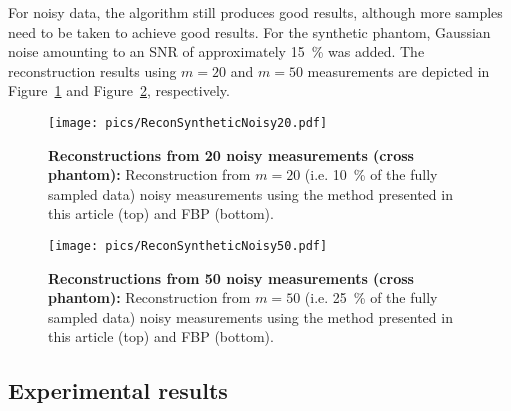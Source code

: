 \documentclass[11pt]{article}
\begin{document}
For noisy data, the algorithm still produces good results, although more samples need to be taken
to achieve good results. For the synthetic phantom, Gaussian noise amounting to
an SNR of approximately \SI{15}{\percent} was added. The reconstruction results using $m=20$ and $m=50$  measurements  are  depicted in Figure~\ref{fig:reconNoisy20} and Figure~\ref{fig:reconNoisy50}, respectively.

\begin{psfrags}
	\begin{figure}[htb!]
		\begin{center}
			\texttt{[image: pics/ReconSyntheticNoisy20.pdf]}
			\caption{\textbf{Reconstructions from 20 noisy measurements (cross phantom):} \label{fig:reconNoisy20} Reconstruction from $m=20$
				(i.e. \SI{10}{\percent} of the fully sampled data) noisy measurements using the method presented in this article (top) and FBP (bottom).}
		\end{center}
	\end{figure}
\end{psfrags}

\begin{psfrags}
	\begin{figure}[htb!]
		\begin{center}
			\texttt{[image: pics/ReconSyntheticNoisy50.pdf]}
			\caption{\label{fig:reconNoisy50} \textbf{Reconstructions from 50 noisy   measurements (cross phantom):} Reconstruction from $m=50$ (i.e. \SI{25}{\percent}
				of the fully sampled data) noisy measurements using the method presented in this article (top) and FBP (bottom).}
		\end{center}
	\end{figure}
\end{psfrags}


\subsection{Experimental results}
\end{document}
